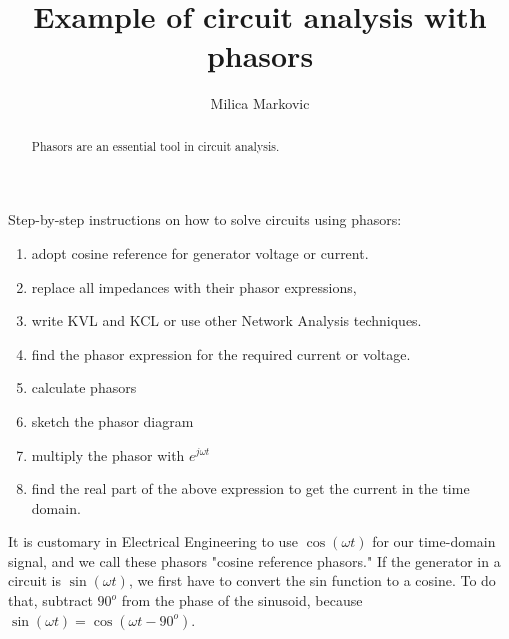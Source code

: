 \documentclass{ximera}
\title{Example of circuit analysis with phasors}
\author{Milica Markovic}
\begin{document}
  
\begin{abstract}  
Phasors are an essential tool in circuit analysis.
\end{abstract}  
\maketitle    




 Step-by-step instructions on how to solve circuits using phasors:
\begin{enumerate}
\item adopt cosine reference for generator voltage or current. 
\item replace all impedances with their phasor expressions,
\item write KVL and KCL or use other Network Analysis techniques.
\item find the phasor expression for the required current or voltage. 
\item calculate phasors 
\item sketch the phasor diagram
\item multiply the phasor with $e^{j \omega t}$  
\item find the real part of the above expression to get the current in the time domain.
\end{enumerate}


It is customary in Electrical Engineering to use  $\cos( \omega t)$ for our time-domain signal, and we call these phasors "cosine reference phasors."  If the generator in a circuit is  $\sin (\omega t)$, we first have to convert the sin function to a cosine. To do that, subtract $90^o$ from the phase of the sinusoid, because $\sin( \omega t) = \cos(\omega t - 90^o)$.
\end{document}

